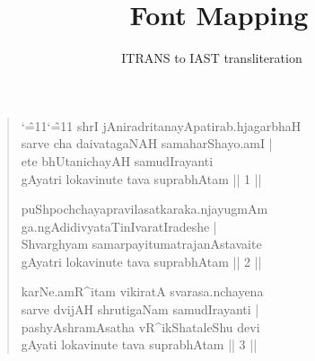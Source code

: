 \documentclass[a4paper,oneside,12pt]{article}
\title{\XeTeX\ Font Mapping}
\author{ITRANS to IAST transliteration}
\date{\relax}
\newcommand\sa{\catcode`\^=11\catcode`\~=11%
              \fontspec[Script=Latin,Mapping=itrans-iast,Numbers=Lining,Scale=MatchLowercase]{Brill}}
\begin{document}
\maketitle
\thispagestyle{empty}
\bigskip

\begin{verse}
  {\sa shrI jAniradritanayApatirab.hjagarbhaH\\
    sarve cha daivatagaNAH samaharShayo.amI |\\
    ete bhUtanichayAH samudIrayanti\\
    gAyatri \- lokavinute tava suprabhAtam || 1 ||

    puShpochchayapravilasatkaraka.njayugmAm\\
    ga.ngAdidivyataTinIvaratIradeshe\- |\\
    Shvarghyam samarpayitumatrajanAstavaite\\
    gAyatri \- lokavinute \- tava suprabhAtam || 2 ||

    karNe.amR^itam vikiratA svarasa.nchayena\\
    sarve dvijAH shrutigaNam samudIrayanti |\\
    pashyAshramAsatha vR^ikShataleShu devi\\
    gAyati \-lokavinute \-tava suprabhAtam || 3 ||
  }
\end{verse}
\end{document}
